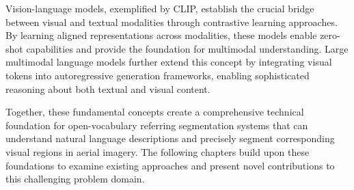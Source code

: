 Vision-language models, exemplified by CLIP, establish the crucial bridge between visual and textual modalities through contrastive learning approaches. By learning aligned representations across modalities, these models enable zero-shot capabilities and provide the foundation for multimodal understanding. Large multimodal language models further extend this concept by integrating visual tokens into autoregressive generation frameworks, enabling sophisticated reasoning about both textual and visual content.

Together, these fundamental concepts create a comprehensive technical foundation for open-vocabulary referring segmentation systems that can understand natural language descriptions and precisely segment corresponding visual regions in aerial imagery. The following chapters build upon these foundations to examine existing approaches and present novel contributions to this challenging problem domain.